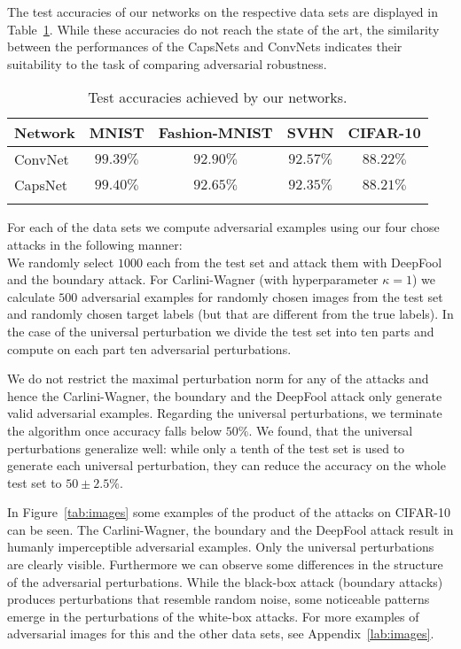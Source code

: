 The test accuracies of our networks on the respective data sets are displayed in Table~\ref{tab:accuracies}.
While these accuracies do not reach the state of the art, the similarity between the performances of the CapsNets and ConvNets indicates their suitability to the task of comparing adversarial robustness.

\begin{table}
	
	\centering%
	\begin{tabular}{lcccc}
		\toprule
		Network       & MNIST & Fashion-MNIST & SVHN & CIFAR-10  \\
		\midrule
		ConvNet           & $99.39\%$ & $92.90\%$ & $92.57\%$ & $88.22\%$ \\
		CapsNet           & $99.40\%$ & $92.65\%$ & $92.35\%$ & $88.21\%$ \\
		\bottomrule\\
	\end{tabular}%
	\caption{Test accuracies achieved by our networks.}
	\label{tab:accuracies}
\end{table}

For each of the data sets we compute adversarial examples using our four chose attacks in the following manner: \\
We randomly select $1000$ each from the test set and attack them with DeepFool and the boundary attack.
For Carlini-Wagner (with hyperparameter $\kappa=1$) we calculate $500$ adversarial examples for randomly chosen images from the test set and randomly chosen target labels (but that are different from the true labels). In the case of the universal perturbation we divide the test set into ten parts and compute on each part ten adversarial perturbations.

We do not restrict the maximal perturbation norm for any of the attacks and hence the Carlini-Wagner, the boundary and the DeepFool attack only generate valid adversarial examples.
Regarding the universal perturbations, we terminate the algorithm once accuracy falls below $50\%$.
We found, that the universal perturbations generalize well: while only a tenth of the test set is used to generate each universal perturbation, they can reduce the accuracy on the whole test set to $50\pm2.5\%$.

In Figure~\ref{tab:images} some examples of the product of the attacks on CIFAR-10 can be seen. The Carlini-Wagner, the boundary and the DeepFool attack result in humanly imperceptible adversarial examples. Only the universal perturbations are clearly visible. Furthermore we can observe some differences in the structure of the adversarial perturbations. While the black-box attack (boundary attacks) produces perturbations that resemble random noise, some noticeable patterns emerge in the perturbations of the white-box attacks. For more examples of adversarial images for this and the other data sets, see Appendix~\ref{lab:images}.

